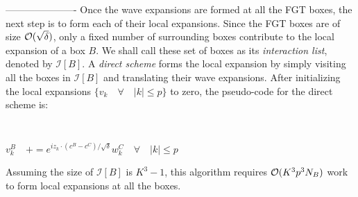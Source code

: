----------------------
Once the wave expansions are formed at all the FGT boxes, the next step is to form each of their local expansions. Since the FGT boxes are of size $\mathcal{O}(\sqrt{\delta})$, only a fixed number of surrounding boxes contribute to the local expansion of a box $B$. We shall call these set of boxes as its {\em interaction list}, denoted by $\mathcal{I} [B]$. A {\em direct scheme} forms the local expansion by simply visiting all the boxes in $\mathcal{I}[B]$ and translating their wave expansions. After initializing the local expansions $\{ v_k \quad \forall \quad |k| \leq p \}$ to zero, the pseudo-code for the direct scheme is:
%
{\tt
\begin{algorithmic}
           \STATE $ v_k^B \quad += e^{i z_k \cdot(c^B - c^C)/\sqrt{\delta}} w_k^C \quad \forall \quad |k| \leq p$
       \ENDFOR
\STATE
\end{algorithmic}
}
%
Assuming the size of $\mathcal{I}[B]$ is $K^3 - 1$, this algorithm requires $\mathcal{O}(K^3 p^3 N_B)$ work to form local expansions at all the boxes. 

